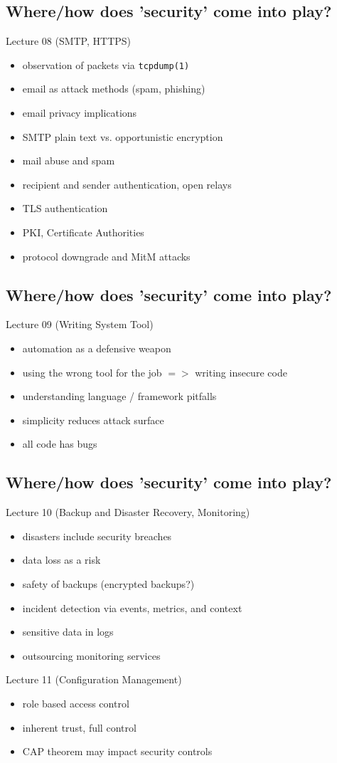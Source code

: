 \documentclass[xga]{xdvislides}
\begin{document}
\subsection{Where/how does 'security' come into play?}
Lecture 08 (SMTP, HTTPS)
\begin{itemize}
	\item observation of packets via {\tt tcpdump(1)}
	\item email as attack methods (spam, phishing)
	\item email privacy implications
	\item SMTP plain text vs. opportunistic encryption
	\item mail abuse and spam
	\item recipient and sender authentication, open relays
	\item TLS authentication
	\item PKI, Certificate Authorities
	\item protocol downgrade and MitM attacks
\end{itemize}

\subsection{Where/how does 'security' come into play?}
Lecture 09 (Writing System Tool)
\begin{itemize}
	\item automation as a defensive weapon
	\item using the wrong tool for the job $=>$ writing insecure code
	\item understanding language / framework pitfalls
	\item simplicity reduces attack surface
	\item all code has bugs
\end{itemize}
\vspace{.5in}

\subsection{Where/how does 'security' come into play?}
Lecture 10 (Backup and Disaster Recovery, Monitoring)
\begin{itemize}
	\item disasters include security breaches
	\item data loss as a risk
	\item safety of backups (encrypted backups?)
	\item incident detection via events, metrics, and context
	\item sensitive data in logs
	\item outsourcing monitoring services
\end{itemize}
\vspace{.2in}
Lecture 11 (Configuration Management)
\begin{itemize}
	\item role based access control
	\item inherent trust, full control
	\item CAP theorem may impact security controls
\end{itemize}
\end{document}
